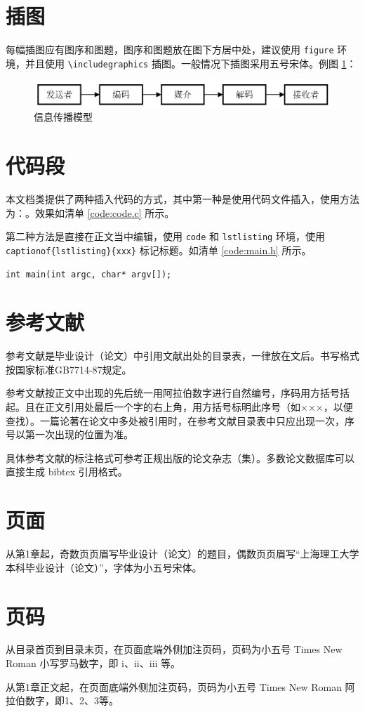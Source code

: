 \section{插图}
\par 每幅插图应有图序和图题，图序和图题放在图下方居中处，建议使用 \verb|figure| 环境，并且使用 \verb|\includegraphics| 插图。一般情况下插图采用五号宋体。例图 \ref{figure:model}：

\begin{figure}[htb]
    \figureCapSet
    \centering
    \includegraphics[width=.8\linewidth]{figure/egf.png}
    \caption{信息传播模型}
    \label{figure:model}
\end{figure}

\section{代码段}
\par 本文档类提供了两种插入代码的方式，其中第一种是使用代码文件插入，使用方法为：\lstinline||。效果如清单 \ref{code:code.c} 所示。
\codeCapSet


\par 第二种方法是直接在正文当中编辑，使用 \lstinline|code| 和 \lstinline|lstlisting| 环境，使用 \lstinline|captionof{lstlisting}{xxx}| 标记标题。如清单 \ref{code:main.h} 所示。
\begin{code}
\label{code:main.h}
\begin{lstlisting}
int main(int argc, char* argv[]);
\end{lstlisting}
\end{code}

\section{参考文献}

\par 参考文献是毕业设计（论文）中引用文献出处的目录表，一律放在文后。书写格式按国家标准GB7714-87规定。
\par 参考文献按正文中出现的先后统一用阿拉伯数字进行自然编号，序码用方括号括起。且在正文引用处最后一个字的右上角，用方括号标明此序号（如×××\cite{论文}，以便查找）。一篇论著在论文中多处被引用时，在参考文献目录表中只应出现一次，序号以第一次出现的位置为准。
\par 具体参考文献的标注格式可参考正规出版的论文杂志（集）。多数论文数据库可以直接生成 bibtex 引用格式。

\section{页面}
\par 从第1章起，奇数页页眉写毕业设计（论文）的题目，偶数页页眉写“上海理工大学本科毕业设计（论文）”，字体为小五号宋体。

\section{页码}
\par 从目录首页到目录末页，在页面底端外侧加注页码，页码为小五号 Times New Roman 小写罗马数字，即 i、ii、iii 等。
\par 从第1章正文起，在页面底端外侧加注页码，页码为小五号 Times New Roman 阿拉伯数字，即1、2、3等。

